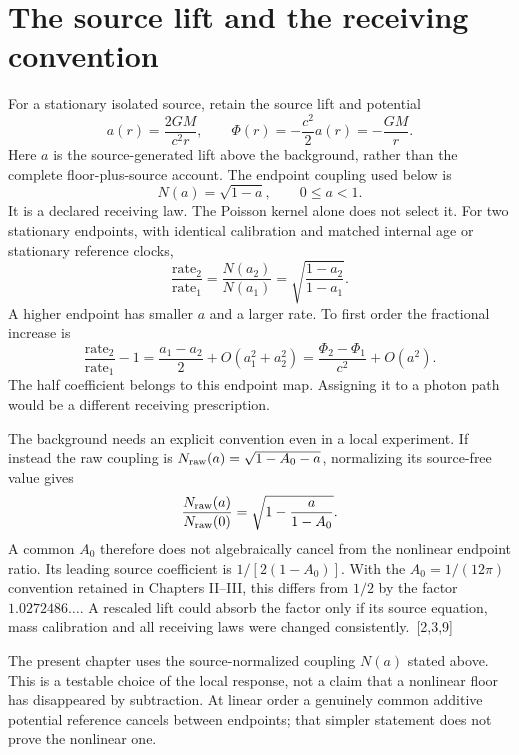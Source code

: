 \documentclass[10pt,twocolumn,letterpaper]{article}
\begin{document}
\section{The source lift and the receiving convention}


For a stationary isolated source, retain the source lift and potential
\[
 a(r)=\frac{2GM}{c^2r},\qquad \Phi(r)=-\frac{c^2}{2}a(r)=-\frac{GM}{r}.
\]
Here $a$ is the source-generated lift above the background, rather than the complete floor-plus-source account. The endpoint coupling used below is
\[
 N(a)=\sqrt{1-a},\qquad 0\leq a<1.
\]
It is a declared receiving law. The Poisson kernel alone does not select it. For two stationary endpoints, with identical calibration and matched internal age or stationary reference clocks,
\[
 \frac{\text{rate}_2}{\text{rate}_1}
 =\frac{N(a_2)}{N(a_1)}
 =\sqrt{\frac{1-a_2}{1-a_1}}.
\]
A higher endpoint has smaller $a$ and a larger rate. To first order the fractional increase is
\[
 \frac{\text{rate}_2}{\text{rate}_1}-1
 =\frac{a_1-a_2}{2}+O(a_1^2+a_2^2)
 =\frac{\Phi_2-\Phi_1}{c^2}+O(a^2).
\]
The half coefficient belongs to this endpoint map. Assigning it to a photon path would be a different receiving prescription.

The background needs an explicit convention even in a local experiment. If instead the raw coupling is $N_{\rm raw}(a)=\sqrt{1-A_0-a}$, normalizing its source-free value gives
\[
 \frac{N_{\rm raw}(a)}{N_{\rm raw}(0)}
 =\sqrt{1-\frac{a}{1-A_0}}.
\]
A common $A_0$ therefore does not algebraically cancel from the nonlinear endpoint ratio. Its leading source coefficient is $1/[2(1-A_0)]$. With the $A_0=1/(12\pi)$ convention retained in Chapters II--III, this differs from $1/2$ by the factor $1.0272486\ldots$. A rescaled lift could absorb the factor only if its source equation, mass calibration and all receiving laws were changed consistently.~[2,3,9]

The present chapter uses the source-normalized coupling $N(a)$ stated above. This is a testable choice of the local response, not a claim that a nonlinear floor has disappeared by subtraction. At linear order a genuinely common additive potential reference cancels between endpoints; that simpler statement does not prove the nonlinear one.

\end{document}
